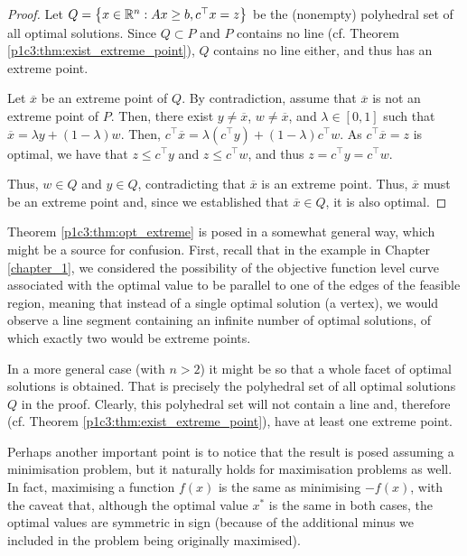 \begin{proof}
	Let $Q = \left\{ x \in \mathbb{R}^n : Ax \geq b, c^\top x = z \right \}$ be the (nonempty) polyhedral set of all optimal solutions. Since $Q \subset P$ and $P$ contains no line (cf. Theorem \ref{p1c3:thm:exist_extreme_point}), $Q$ contains no line either, and thus has an extreme point.

	Let $\overline{x}$ be an extreme point of $Q$. By contradiction, assume that $\overline{x}$ is not an extreme point of $P$. Then, there exist $y \neq \overline{x}$, $w \neq \overline{x}$, and $\lambda \in [0,1]$ such that $\overline{x} = \lambda y + (1-\lambda)w$. Then, $c^\top \overline{x} = \lambda (c^\top y) + (1-\lambda)c^\top w$. As $c^\top \overline{x} = z$ is optimal, we have that $z \leq c^\top y$ and $z \leq c^\top w$,  and thus $z = c^\top y = c^\top w$. 
	
	Thus, $w \in Q$ and $y \in Q$, contradicting that $\overline{x}$ is an extreme point. Thus, $\overline{x}$ must be an extreme point and, since we established that $\overline{x} \in Q$, it is also optimal. 
\end{proof}

Theorem \ref{p1c3:thm:opt_extreme} is posed in a somewhat general way, which might be a source for confusion. First, recall that in the example in Chapter \ref{chapter_1}, we considered the possibility of the objective function level curve associated with the optimal value to be parallel to one of the edges of the feasible region, meaning that instead of a single optimal solution (a vertex), we would observe a line segment containing an infinite number of optimal solutions, of which exactly two would be extreme points. 

In a more general case (with $n > 2$) it might be so that a whole facet of optimal solutions is obtained. That is precisely the polyhedral set of all optimal solutions $Q$ in the proof. Clearly, this polyhedral set will not contain a line and, therefore (cf. Theorem \ref{p1c3:thm:exist_extreme_point}), have at least one extreme point. 

Perhaps another important point is to notice that the result is posed assuming a minimisation problem, but it naturally holds for maximisation problems as well. In fact, maximising a function $f(x)$ is the same as minimising $-f(x)$, with the caveat that, although the optimal value $x^*$ is the same in both cases, the optimal values are symmetric in sign (because of the additional minus we included in the problem being originally maximised).

